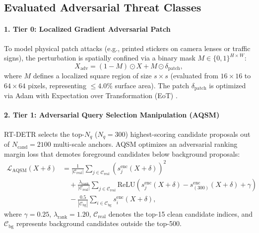 \documentclass[preprint,12pt]{elsarticle}
\begin{document}
\subsection{Evaluated Adversarial Threat Classes}

\paragraph{1. Tier 0: Localized Gradient Adversarial Patch}
To model physical patch attacks (e.g., printed stickers on camera lenses or traffic signs), the perturbation is spatially confined via a binary mask $M \in \{0, 1\}^{H \times W}$:
\begin{equation}
    X_{\mathrm{adv}} = (1 - M) \odot X + M \odot \delta_{\mathrm{patch}},
\end{equation}
where $M$ defines a localized square region of size $s \times s$ (evaluated from $16 \times 16$ to $64 \times 64$ pixels, representing $\le 4.0\%$ surface area). The patch $\delta_{\mathrm{patch}}$ is optimized via Adam with Expectation over Transformation (EoT) \citep{athalye2018synthesizing}.

\paragraph{2. Tier 1: Adversarial Query Selection Manipulation (AQSM)}
RT-DETR selects the top-$N_q$ ($N_q = 300$) highest-scoring candidate proposals out of $N_{\mathrm{cand}}=2100$ multi-scale anchors. AQSM optimizes an adversarial ranking margin loss that demotes foreground candidates below background proposals:
\begin{equation}
\begin{aligned}
    \mathcal{L}_{\mathrm{AQSM}}(X + \delta) &= \frac{1}{|\mathcal{C}_{\mathrm{real}}|} \sum_{j \in \mathcal{C}_{\mathrm{real}}} \left( s_j^{\mathrm{enc}}(X + \delta) \right)^2 \\
    &\quad + \frac{\lambda_{\mathrm{rank}}}{|\mathcal{C}_{\mathrm{real}}|} \sum_{j \in \mathcal{C}_{\mathrm{real}}} \mathrm{ReLU}\left( s_j^{\mathrm{enc}}(X + \delta) - s_{(300)}^{\mathrm{enc}}(X + \delta) + \gamma \right) \\
    &\quad - \frac{0.5}{|\mathcal{C}_{\mathrm{bg}}|} \sum_{i \in \mathcal{C}_{\mathrm{bg}}} s_i^{\mathrm{enc}}(X + \delta),
\end{aligned}
\end{equation}
where $\gamma = 0.25$, $\lambda_{\mathrm{rank}} = 1.20$, $\mathcal{C}_{\mathrm{real}}$ denotes the top-15 clean candidate indices, and $\mathcal{C}_{\mathrm{bg}}$ represents background candidates outside the top-500.
\end{document}
